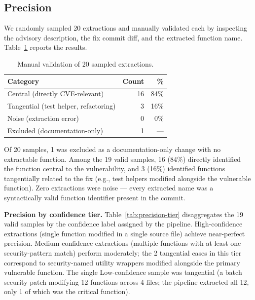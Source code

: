 \documentclass[sigconf,nonacm]{acmart}
\begin{document}
\subsection{Precision}

We randomly sampled 20 extractions and manually validated each by 
inspecting the advisory description, the fix commit diff, and the 
extracted function name. Table~\ref{tab:precision} reports the results.

\begin{table}[t]
    \centering
    \caption{Manual validation of 20 sampled extractions.}
    \label{tab:precision}
    \begin{tabular}{lrr}
        \toprule
        \textbf{Category} & \textbf{Count} & \textbf{\%} \\
        \midrule
        Central (directly CVE-relevant) & 16 & 84\% \\
        Tangential (test helper, refactoring) & 3 & 16\% \\
        Noise (extraction error) & 0 & 0\% \\
        \midrule
        Excluded (documentation-only) & 1 & --- \\
        \bottomrule
    \end{tabular}
\end{table}

Of 20 samples, 1 was excluded as a documentation-only change with no
extractable function.
Among the 19 valid samples, 16 (84\%) directly identified the function
central to the vulnerability, and 3 (16\%) identified functions tangentially
related to the fix (e.g., test helpers modified alongside the vulnerable
function).
Zero extractions were noise --- every extracted name was a syntactically valid
function identifier present in the commit.

\textbf{Precision by confidence tier.}
Table~\ref{tab:precision-tier} disaggregates the 19 valid samples
by the confidence label assigned by the pipeline.
High-confidence extractions (single function modified in a single source
file) achieve near-perfect precision.
Medium-confidence extractions (multiple functions with at least one
security-pattern match) perform moderately; the 2 tangential cases in
this tier correspond to security-named utility wrappers modified
alongside the primary vulnerable function.
The single Low-confidence sample was tangential (a batch security patch
modifying 12 functions across 4 files; the pipeline extracted all 12,
only 1 of which was the critical function).
\end{document}
